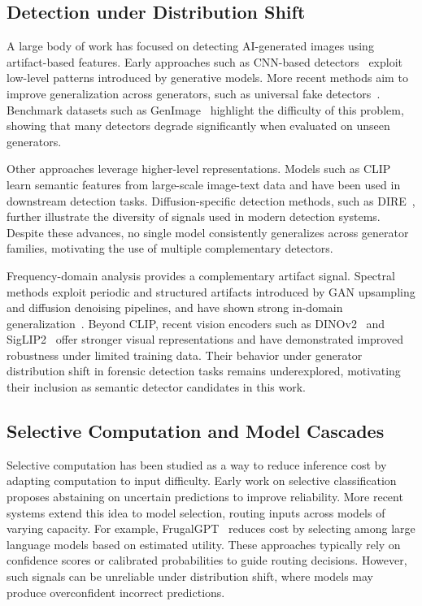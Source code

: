 \documentclass{ieeeaccess}
\begin{document}
\subsection{Detection under Distribution Shift}

A large body of work has focused on detecting AI-generated images using artifact-based features. Early approaches such as CNN-based detectors~\cite{wang2020cnn} exploit low-level patterns introduced by generative models. More recent methods aim to improve generalization across generators, such as universal fake detectors~\cite{ojha2023fakedetect}. Benchmark datasets such as GenImage~\cite{NEURIPS2023_f4d4a021} highlight the difficulty of this problem, showing that many detectors degrade significantly when evaluated on unseen generators.

Other approaches leverage higher-level representations. Models such as CLIP~\cite{pmlr-v139-radford21a} learn semantic features from large-scale image-text data and have been used in downstream detection tasks. Diffusion-specific detection methods, such as DIRE~\cite{Wang_2023_ICCV}, further illustrate the diversity of signals used in modern detection systems. Despite these advances, no single model consistently generalizes across generator families, motivating the use of multiple complementary detectors.

Frequency-domain analysis provides a complementary artifact signal. Spectral methods
exploit periodic and structured artifacts introduced by GAN upsampling and diffusion
denoising pipelines, and have shown strong in-domain generalization~\cite{Corvi_2023_ICASSP}.
Beyond CLIP, recent vision encoders such as DINOv2~\cite{oquab2023dinov2} and
SigLIP2~\cite{tschannen2025siglip2} offer stronger visual representations and have
demonstrated improved robustness under limited training data. Their behavior under
generator distribution shift in forensic detection tasks remains underexplored, motivating
their inclusion as semantic detector candidates in this work.


\subsection{Selective Computation and Model Cascades}

Selective computation has been studied as a way to reduce inference cost by adapting computation to input difficulty. Early work on selective classification~\cite{NIPS2017_4a8423d5} proposes abstaining on uncertain predictions to improve reliability. More recent systems extend this idea to model selection, routing inputs across models of varying capacity. For example, FrugalGPT~\cite{chen2024frugalgpt} reduces cost by selecting among large language models based on estimated utility. These approaches typically rely on confidence scores or calibrated probabilities to guide routing decisions. However, such signals can be unreliable under distribution shift, where models may produce overconfident incorrect predictions.
\end{document}
